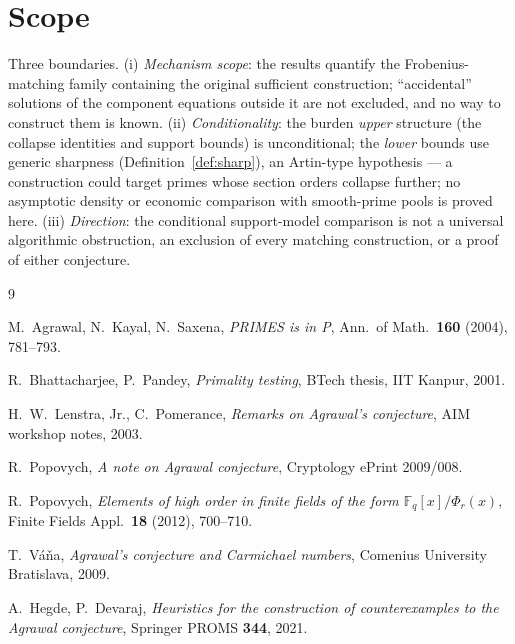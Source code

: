 \documentclass[11pt]{article}
\theoremstyle{remark}
\newcommand{\F}{\mathbb{F}}
\begin{document}
\section{Scope}

Three boundaries. (i) \emph{Mechanism scope}: the results quantify
the Frobenius-matching family containing the original sufficient
construction; ``accidental''
solutions of the component equations outside it are not excluded, and no
way to construct them is known. (ii) \emph{Conditionality}: the burden
\emph{upper} structure (the collapse identities and support bounds) is
unconditional; the \emph{lower} bounds use generic sharpness
(Definition~\ref{def:sharp}), an Artin-type hypothesis --- a construction
could target primes whose section orders collapse further; no asymptotic
density or economic comparison with smooth-prime pools is proved here.
(iii) \emph{Direction}: the conditional support-model comparison is not a
universal algorithmic obstruction, an exclusion of every matching
construction, or a proof of either conjecture.

\begin{thebibliography}{9}\itemsep1pt\small

 M.~Agrawal, N.~Kayal, N.~Saxena, \emph{PRIMES is in P},
Ann.\ of Math.\ \textbf{160} (2004), 781--793.

 R.~Bhattacharjee, P.~Pandey, \emph{Primality testing},
BTech thesis, IIT Kanpur, 2001.

 H.~W.~Lenstra, Jr., C.~Pomerance, \emph{Remarks on
Agrawal's conjecture}, AIM workshop notes, 2003.

 R.~Popovych, \emph{A note on Agrawal conjecture},
Cryptology ePrint 2009/008.

 R.~Popovych, \emph{Elements of high order in finite
fields of the form $\F_q[x]/\Phi_r(x)$}, Finite Fields Appl.\
\textbf{18} (2012), 700--710.

 T.~V\'a\v{n}a, \emph{Agrawal's conjecture and
Carmichael numbers}, Comenius University Bratislava, 2009.

 A.~Hegde, P.~Devaraj, \emph{Heuristics for the
construction of counterexamples to the Agrawal conjecture}, Springer
PROMS \textbf{344}, 2021.

\end{thebibliography}
\end{document}
